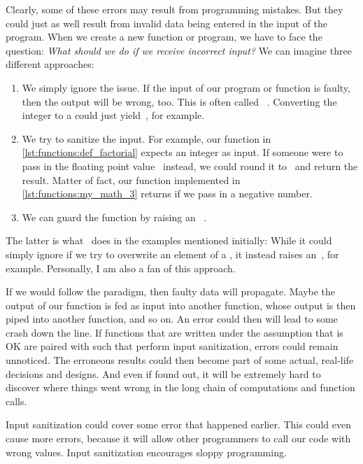 Clearly, some of these errors may result from programming mistakes.
But they could just as well result from invalid data being entered in the input of the program.%
%
%
When we create a new function or program, we have to face the question:
\emph{What should we do if we receive incorrect input?}
We can imagine three different approaches:%
%
\begin{enumerate}%
%
\item We simply ignore the issue.
If the input of our program or function is faulty, then the output will be wrong, too.
This is often called ~\cite{PKBCBR2005GIGOAELAOMBEUP}.
Converting the integer  to a  could just yield~, for example.%
%
\item We try to sanitize the input.
For example, our  function in \cref{lst:functions:def_factorial} expects an integer as input.
If someone were to pass in the floating point value~ instead, we could round it to~ and return the result.
Matter of fact, our  function implemented in \cref{lst:functions:my_math_3} returns  if we pass in a negative number.%
%
\item We can guard the function by raising an ~\cite{MAGTOC2024EHFAP,SF2013ASROSR,GRRX2001ACSOEHMFBDOOS}.%
%
\end{enumerate}%
%
The latter is what \python\ does in the examples mentioned initially:
While it could simply ignore if we try to overwrite an element of a , it instead raises an~, for example.
Personally, I am also a fan of this approach.

If we would follow the  paradigm, then faulty data will propagate.
Maybe the output of our function is fed as input into another function, whose output is then piped into another function, and so on.
An error could then will lead to some crash down the line.
If functions that are written under the assumption that  is OK are paired with such that perform input sanitization, errors could remain unnoticed.
The erroneous results could then become part of some actual, real-life decisions and designs.
And even if found out, it will be extremely hard to discover where things went wrong in the long chain of computations and function calls.

Input sanitization could cover some error that happened earlier.
This could even cause more errors, because it will allow other programmers to call our code with wrong values.
Input sanitization encourages sloppy programming.

